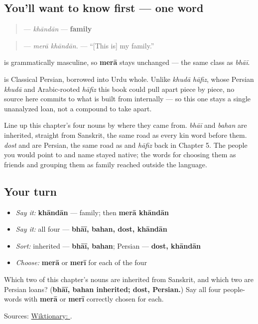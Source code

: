 \subsection*{You'll want to know first — one word}
\begin{quote}
\textbf{} — \emph{khāndān} — \textbf{family}
\end{quote}

\begin{quote}
\textbf{ } — \emph{merā khāndān.} — \textquotedblleft{}{[}This is{]} my family.\textquotedblright{}
\end{quote}

\textbf{} is grammatically masculine, so \textbf{merā} stays unchanged — the same class as \emph{bhāī}.

\begin{cousinweb}
\textbf{} is Classical Persian, borrowed into Urdu whole. Unlike \emph{khudā hāfiz}, whose Persian \emph{khudā} and Arabic-rooted \emph{hāfiz} this book could pull apart piece by piece, no source here commits to what \textbf{} is built from internally — so this one stays a single unanalyzed loan, not a compound to take apart.

Line up this chapter's four nouns by where they came from. \emph{bhāī} and \emph{bahan} are inherited, straight from Sanskrit, the same road as every kin word before them. \emph{dost} and \textbf{} are Persian, the same road as \textbf{} and \emph{hāfiz} back in Chapter 5. The people you would point to and name stayed native; the words for choosing them as friends and grouping them as family reached outside the language.
\end{cousinweb}

\subsection*{Your turn}
\begin{itemize}
\raggedright
  \item \emph{Say it:} \textbf{khāndān} — family; then \textbf{merā khāndān}
  \item \emph{Say it:} all four — \textbf{bhāī, bahan, dost, khāndān}
  \item \emph{Sort:} inherited — \textbf{bhāī, bahan}; Persian — \textbf{dost, khāndān}
  \item \emph{Choose:} \textbf{merā} or \textbf{merī} for each of the four
\end{itemize}

\begin{tcolorbox}[breakable,colback=teal!4,colframe=teal!35!black,title={Before you move on}]
Which two of this chapter's nouns are inherited from Sanskrit, and which two are Persian loans? (\textbf{bhāī, bahan inherited; dost,  Persian.}) Say all four people-words with \textbf{merā} or \textbf{merī} correctly chosen for each.

Sources: \href{https://en.wiktionary.org/wiki/\%D8\%AE\%D8\%A7\%D9\%86\%D8\%AF\%D8\%A7\%D9\%86}{Wiktionary: }.
\end{tcolorbox}

